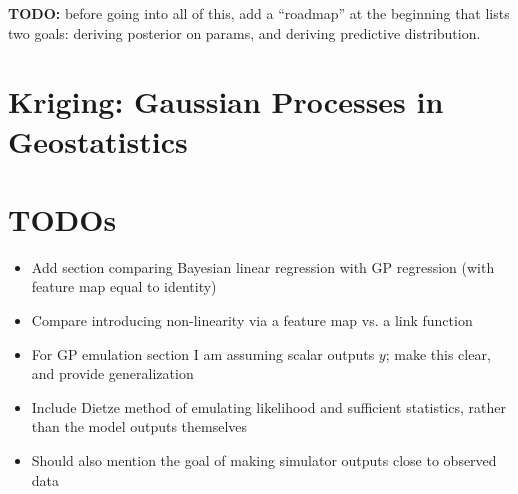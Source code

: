 \documentclass[12pt]{article}
\begin{document}
\textbf{TODO: } before going into all of this, add a ``roadmap'' at the beginning that lists two goals: deriving posterior on params, and deriving predictive distribution. 

\section{Kriging: Gaussian Processes in Geostatistics}

\section{TODOs}
\begin{itemize}
\item Add section comparing Bayesian linear regression with GP regression (with feature map equal to identity)
\item Compare introducing non-linearity via a feature map vs. a link function 
\item For GP emulation section I am assuming scalar outputs $y$; make this clear, and provide generalization
\item Include Dietze method of emulating likelihood and sufficient statistics, rather than the model outputs themselves
\item Should also mention the goal of making simulator outputs close to observed data
\end{itemize}
\end{document}
